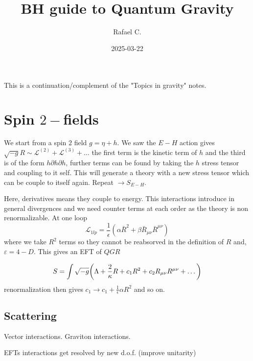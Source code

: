\documentclass[10pt,
 article,
 amsmath,amssymb
]{revtex4-2}
\newcommand{\LL}{\mathcal{L}}
\begin{document}
\title{BH guide to Quantum Gravity}



\author{Rafael C.}




\date{2025-03-22}







\maketitle

\tableofcontents







This is a continuation/complement of the "Topics in gravity" notes.
\section{Spin $2-$fields}
We start from a spin $2$ field $g=\eta + h$. We saw the $E-H$ action gives $\sqrt{-g} R \sim \LL^{(2)}+ \LL^{(3)}+\dots$
the first term is the kinetic term of $h$ and the third is of the form $h \partial h \partial h$, further terms can be found by taking the $h$ stress tensor and coupling to it self. 
This will generate a theory with a new stress tensor which can be couple to itself again. Repeat $\to S_{E-H}$.

Here, derivatives means they couple to energy. This interactions introduce in general divergences 
and we need counter terms at each order as the theory is non renormalizable. At one loop $$\LL_{1lp}=\frac{1}{\epsilon}( \alpha \bar{R}^2 + \beta \bar{R}_{\mu \nu} \bar{R}^{\mu \nu} )$$
where we take $R^2$ terms so they cannot be reabsorved in the definition of $R$ and, $\varepsilon=4-D$. This gives an EFT of $QGR$

\begin{equation}
    S=\int \sqrt{-g}\qty(\Lambda + \frac{2}{\kappa} R+ c_1 R^2 +c_2 R_{\mu \nu }R^{\mu \nu }+ \dots)
\end{equation}
renormalization then gives $c_1 \to c_1+ \frac{1}{\epsilon} \alpha R^2$ and so on.
\subsection{Scattering}
Vector interactions. Graviton interactions. 

EFTs interactions get resolved by new d.o.f. (improve unitarity)
\end{document}
